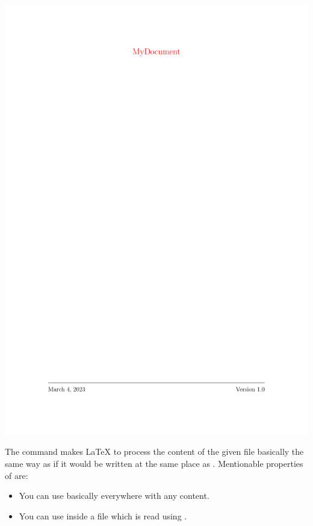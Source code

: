 \begin{myFIG}{}
	\includegraphics[page=2,scale=0.25]{examples/zz_bsp_file_CoverPage.pdf}
\end{myFIG}

\justifying

The \Verb|| command makes \LaTeX{} to process the content of the given file basically the same way as if it would be written at the same place as \Verb||. Mentionable properties of \Verb|| are:

\begin{itemize}
	\item You can use \Verb|| basically everywhere with any content.
	\item You can use \Verb|| inside a file which is read using \Verb||.
\end{itemize}

